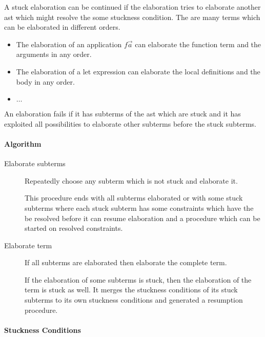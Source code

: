 A stuck elaboration can be continued if the elaboration tries to elaborate
another ast which might resolve the some stuckness condition. The are many terms
which can be elaborated in different orders.

\begin{itemize}
    \item The elaboration of an application $f \vec a$ can elaborate the
        function term and the arguments in any order.

    \item The elaboration of a let expression can elaborate the local
        definitions and the body in any order.

    \item $\ldots$
\end{itemize}

An elaboration fails if it has subterms of the ast which are stuck and it has
exploited all possibilities to elaborate other subterms before the stuck
subterms.


\paragraph{Algorithm}

\begin{description}
\item [Elaborate subterms]

    Repeatedly choose any subterm which is not stuck and elaborate it.

    This procedure ends with all subterms elaborated or with some stuck subterms
    where each stuck subterm has some constraints which have the be resolved
    before it can resume elaboration and a procedure which can be started on
    resolved constraints.

\item [Elaborate term]
    If all subterms are elaborated then elaborate the complete term.

    If the elaboration of some subterms is stuck, then the elaboration of the
    term is stuck as well. It merges the stuckness conditions of its stuck
    subterms to its own stuckness conditions and generated a resumption
    procedure.
\end{description}



\paragraph{Stuckness Conditions}

